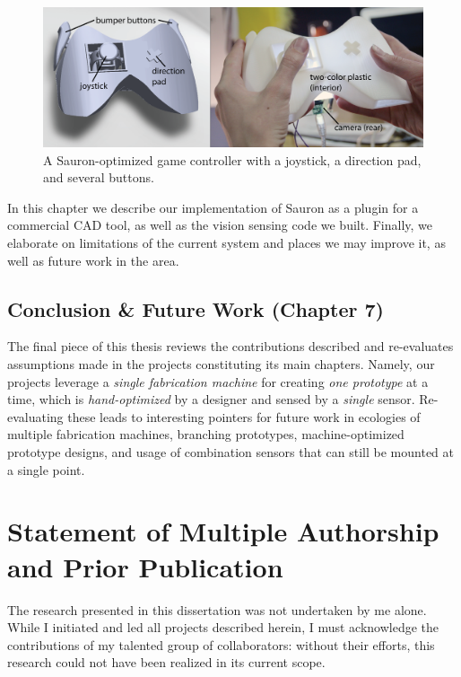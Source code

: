 \begin{figure}[h]
\centering
\includegraphics[width=6in]{figures/sauron/sauron-intro-callouts.png}
\caption{A Sauron-optimized game controller with a joystick, a direction pad, and several buttons.}
\label{fig:sauron-intro}
\end{figure}

In this chapter we describe our implementation of Sauron as a plugin for a commercial CAD tool, as well as the vision sensing code we built. Finally, we elaborate on limitations of the current system and places we may improve it, as well as future work in the area.

\subsection{Conclusion \& Future Work (Chapter 7)}

The final piece of this thesis reviews the contributions described and re-evaluates assumptions made in the projects constituting its main chapters. Namely, our projects leverage a \emph{single fabrication machine} for creating \emph{one prototype} at a time, which is \emph{hand-optimized} by a designer and sensed by a \emph{single} sensor. Re-evaluating these leads to interesting pointers for future work in ecologies of multiple fabrication machines, branching prototypes, machine-optimized prototype designs, and usage of combination sensors that can still be mounted at a single point.

\section{Statement of Multiple Authorship and Prior Publication}

The research presented in this dissertation was not undertaken by me alone. While I initiated
and led all projects described herein, I must acknowledge the contributions of my talented group of collaborators: without their efforts, this research could not have been realized in its current scope.

